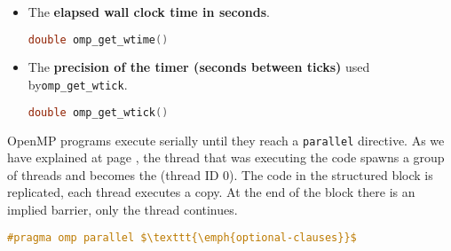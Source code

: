\begin{itemize}
    \item The \textbf{elapsed wall clock time in seconds}.
    \begin{openmpbox}
    	\begin{lstlisting}[language=C++]
double omp_get_wtime()\end{lstlisting}
    \end{openmpbox}
    
    \item The \textbf{precision of the timer (seconds between ticks)} used by\break \texttt{omp\_get\_wtick}.
    \begin{openmpbox}
    	\begin{lstlisting}[language=C++]
double omp_get_wtick()\end{lstlisting}
    \end{openmpbox}
\end{itemize}

\highspace
OpenMP programs execute serially until they reach a \texttt{parallel} directive. As we have explained at page \pageref{figure: how OpenMP works}, the thread that was executing the code spawns a group of  threads and becomes the  (thread ID 0). The code in the structured block is replicated, each thread executes a copy. At the end of the block there is an implied barrier, only the  thread continues.
\begin{openmpbox}
\begin{lstlisting}[language=C++, mathescape=true]
#pragma omp parallel $\texttt{\emph{optional-clauses}}$\end{lstlisting}
\end{openmpbox}

